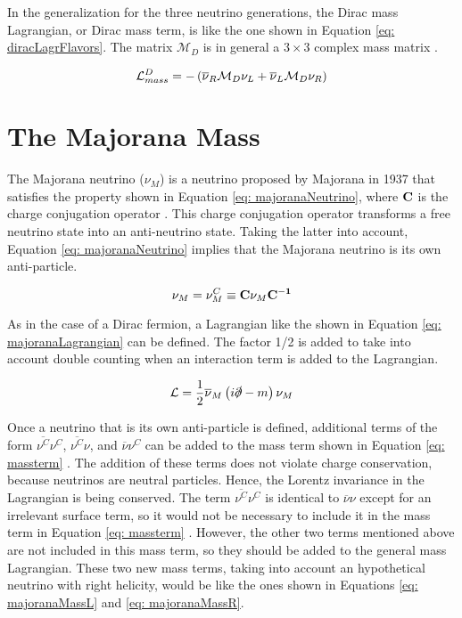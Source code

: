 In the generalization for the three neutrino generations, the Dirac mass Lagrangian, or Dirac mass term, is like the one shown in Equation \ref{eq: diracLagrFlavors}. The matrix $\mathcal{M}_{D}$ is in general a $3 \times 3$ complex mass matrix \cite{NeutrinoMass}.

\begin{equation}\label{eq: diracLagrFlavors}
\mathcal{L}_{mass}^{D} = -\left(\overline{\nu}_{R}\mathcal{M}_{D}\nu_{L} + \overline{\nu}_{L}\mathcal{M}_{D}\nu_{R}\right)
\end{equation}


\section{The Majorana Mass}

The Majorana neutrino ($\nu_{M}$) is a neutrino proposed by Majorana in 1937 that satisfies the property shown in Equation \ref{eq: majoranaNeutrino}, where $\mathbf{C}$ is the charge conjugation operator \cite{NeutrinoMass}. This charge conjugation operator transforms a free neutrino state into an anti-neutrino state. Taking the latter into account, Equation \ref{eq: majoranaNeutrino} implies that the Majorana neutrino is its own anti-particle. 

\begin{equation}\label{eq: majoranaNeutrino}
\nu_{M} = \nu^{C}_{M} \equiv \mathbf{C}\nu_{M}\mathbf{C^{-1}}
\end{equation}

As in the case of a Dirac fermion, a Lagrangian like the shown in Equation \ref{eq: majoranaLagrangian} can be defined. The factor 1/2 is added to take into account double counting when an interaction term is added to the Lagrangian.   

\begin{equation}\label{eq: majoranaLagrangian}
\mathcal{L} = \frac{1}{2}\overline{\nu}_{M}\left(i\slashed{\partial} - m\right)\nu_{M}
\end{equation}

Once a neutrino that is its own anti-particle is defined, additional terms of the form $\overline{\nu^{C}}\nu^{C}$, $\overline{\nu^{C}}\nu$, and $\overline{\nu}\nu^{C}$ can be added to the mass term shown in Equation \ref{eq: massterm} \cite{NeutrinoMass}. The addition of these terms does not violate charge conservation, because neutrinos are neutral particles. Hence, the Lorentz invariance in the Lagrangian is being conserved. The term $\overline{\nu^{C}}\nu^{C}$ is identical to $\overline{\nu}\nu$ except for an irrelevant surface term, so it would not be necessary to include it in the mass term in Equation \ref{eq: massterm} \cite{NeutrinoMass}. However, the other two terms mentioned above are not included in this mass term, so they should be added to the general mass Lagrangian. These two new mass terms, taking into account an hypothetical neutrino with right helicity, would be like the ones shown in Equations \ref{eq: majoranaMassL} and \ref{eq: majoranaMassR}.


